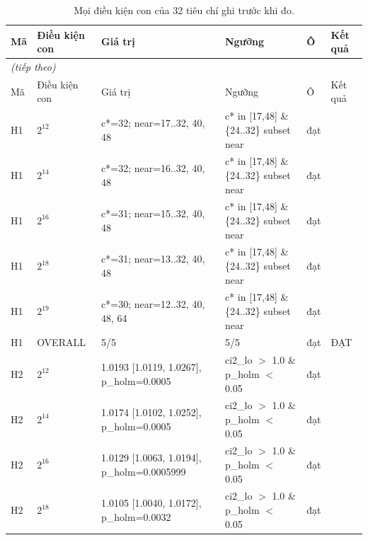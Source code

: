 \scriptsize
\begin{longtable}{p{0.8cm}p{2.2cm}p{3.9cm}p{3.2cm}p{1.1cm}p{2.4cm}}
\caption{Mọi điều kiện con của 32 tiêu chí ghi trước khi đo.}\label{tab:verdicts_full}\\
\toprule
Mã & Điều kiện con & Giá trị & Ngưỡng & Ô & Kết quả \\
\midrule
\endfirsthead
\multicolumn{6}{l}{\textit{(tiếp theo)}}\\
\toprule
Mã & Điều kiện con & Giá trị & Ngưỡng & Ô & Kết quả \\
\midrule
\endhead
\bottomrule
\endlastfoot
H1 & $2^{12}$ & c*=\allowbreak{}32; near=\allowbreak{}17..32, 40, 48 & c* in [17,\allowbreak{}48] \& \{24..32\} subset near & đạt &  \\
H1 & $2^{14}$ & c*=\allowbreak{}32; near=\allowbreak{}16..32, 40, 48 & c* in [17,\allowbreak{}48] \& \{24..32\} subset near & đạt &  \\
H1 & $2^{16}$ & c*=\allowbreak{}31; near=\allowbreak{}15..32, 40, 48 & c* in [17,\allowbreak{}48] \& \{24..32\} subset near & đạt &  \\
H1 & $2^{18}$ & c*=\allowbreak{}31; near=\allowbreak{}13..32, 40, 48 & c* in [17,\allowbreak{}48] \& \{24..32\} subset near & đạt &  \\
H1 & $2^{19}$ & c*=\allowbreak{}30; near=\allowbreak{}12..32, 40, 48, 64 & c* in [17,\allowbreak{}48] \& \{24..32\} subset near & đạt &  \\
H1 & OVERALL & 5/5 & 5/5 & đạt & ĐẠT \\
H2 & $2^{12}$ & 1.0193 [1.0119, 1.0267], p\_\allowbreak{}holm=\allowbreak{}0.0005 & ci2\_\allowbreak{}lo $>$\allowbreak{} 1.0 \& p\_\allowbreak{}holm $<$\allowbreak{} 0.05 & đạt &  \\
H2 & $2^{14}$ & 1.0174 [1.0102, 1.0252], p\_\allowbreak{}holm=\allowbreak{}0.0005 & ci2\_\allowbreak{}lo $>$\allowbreak{} 1.0 \& p\_\allowbreak{}holm $<$\allowbreak{} 0.05 & đạt &  \\
H2 & $2^{16}$ & 1.0129 [1.0063, 1.0194], p\_\allowbreak{}holm=\allowbreak{}0.0005999 & ci2\_\allowbreak{}lo $>$\allowbreak{} 1.0 \& p\_\allowbreak{}holm $<$\allowbreak{} 0.05 & đạt &  \\
H2 & $2^{18}$ & 1.0105 [1.0040, 1.0172], p\_\allowbreak{}holm=\allowbreak{}0.0032 & ci2\_\allowbreak{}lo $>$\allowbreak{} 1.0 \& p\_\allowbreak{}holm $<$\allowbreak{} 0.05 & đạt &  \\

\end{longtable}
